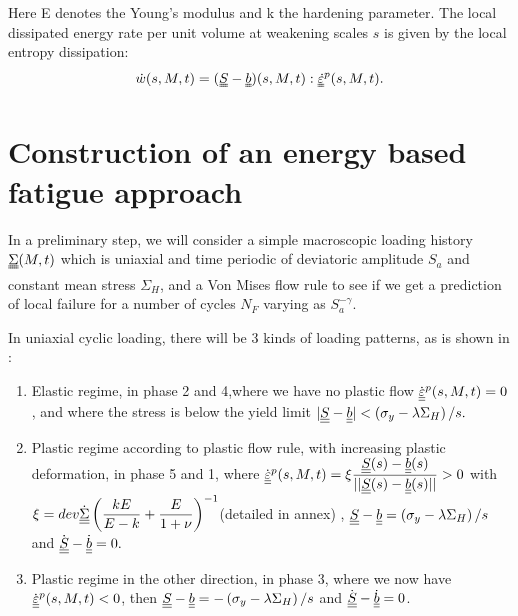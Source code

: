 Here E denotes the Young's modulus and k the hardening parameter. The local dissipated energy rate per unit volume at weakening scales $s$  is given by the local entropy dissipation:
\begin{equation}
\dot{w}(s,M,t)=(\uuline{S}-\uuline{b})(s,M,t):\uuline{\dot{\varepsilon}}^p(s,M,t).
\label{dissipated}
\end{equation}

\section{Construction of an energy based fatigue approach}
\label{sec:5.5}
In a preliminary step, we will consider a simple macroscopic loading history $\uuline{\Sigma}(M, t)$ which is uniaxial
and time periodic of deviatoric amplitude $S_{a}$ and constant mean stress $\Sigma_{H}$, and a Von Mises flow rule to see if we get a prediction of local failure for a number of cycles $N_F$ varying as $S_{a}^{-\gamma}.$

In uniaxial cyclic loading, there will be 3 kinds of loading patterns, as is shown in :

\vspace{6pt}
\begin{enumerate}

\item	Elastic regime, in phase 2 and 4,where we have no plastic flow $\dot{\uline{\uline{\varepsilon}}}^p(s,M,t)=0$ ,  and where the stress is below the yield limit $|\uline{\uline{S}}-\uline{\uline{b}}|< \left( \sigma_y-\lambda \Sigma_H\right)/s. $ 
\vspace{6pt}

\item Plastic regime according to plastic flow rule, with increasing plastic deformation, in phase 5 and 1, where	$\dot{\uline{\uline{\varepsilon}}}^p(s,M,t)=\xi\dfrac{\uline{\uline{S}}(s)-\uline{\uline{b}}(s)}{||\uline{\uline{S}}(s)-\uline{\uline{b}}(s)||}> 0$ with  $\xi= dev\dot{\uline{\uline{\Sigma}}}\left(\dfrac{kE}{E-k}+\dfrac{E}{1+\nu} \right) ^{-1}$(detailed in annex) ,  $\uline{\uline{S}}-\uline{\uline{b}}= \left(\sigma_y-\lambda \Sigma_H\right)/s$ and $\dot{\uline{\uline{S}}}-\dot{\uline{\uline{b}}}=0.$ 
\vspace{6pt}

\item Plastic regime in the other direction, in phase 3, where we now have	$\dot{\uline{\uline{\varepsilon}}}^p(s,M,t)<0$,  then $\uline{\uline{S}}-\uline{\uline{b}}=- \left(\sigma_y-\lambda \Sigma_H\right)/s$ and $\dot{\uline{\uline{S}}}-\dot{\uline{\uline{b}}}=0$.

\end{enumerate}	


